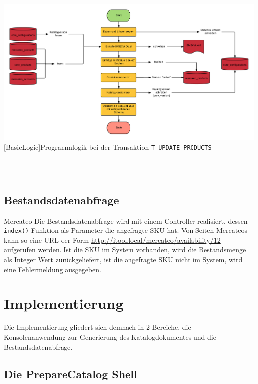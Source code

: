 	\begin{minipage}{\linewidth}
		\vspace{1em}
		\centering
		\includegraphics[width=1 \linewidth]{img/updateCatalogComplete}
		[BasicLogic]{Programmlogik  bei der Transaktion \texttt{T\_UPDATE\_PRODUCTS}}
		\vspace{1em}
	\end{minipage}\\
	
	\
	
	\subsection{Bestandsdatenabfrage}
	
	Mercateo 
	Die Bestandsdatenabfrage wird mit einem Controller realisiert, dessen \texttt{index()} Funktion als Parameter die angefragte SKU hat.
	Von Seiten Mercateos kann so eine URL der Form \url{http://itool.local/mercateo/availability/12} aufgerufen werden. Ist die SKU im System vorhanden, wird die Bestandsmenge als Integer Wert zurückgeliefert, ist die angefragte SKU nicht im System, wird eine Fehlermeldung ausgegeben.
	
	\section{Implementierung}
	
	Die Implementierung gliedert sich demnach in 2 Bereiche, die Konsolenanwendung zur Generierung des Katalogdokumentes und die Bestandsdatenabfrage.
	
	\subsection{Die PrepareCatalog Shell}
	
